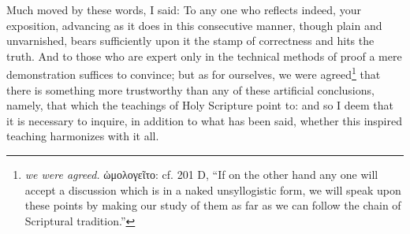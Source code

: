 Much moved by these words, I said: To any one who reflects indeed, your exposition, advancing as it does in this consecutive manner, though plain and unvarnished, bears sufficiently upon it the stamp of correctness and hits the truth. And to those who are expert only in the technical methods of proof a mere demonstration suffices to convince; but as for ourselves, we were agreed\footnote{\emph{we were agreed.} \textgreek{ὡμολογεῖτο}: cf. 201 D, “If on the other hand any one will accept a discussion which is in a naked unsyllogistic form, we will speak upon these points by making our study of them as far as we can follow the chain of Scriptural tradition.”} that there is something more trustworthy than any of these artificial conclusions, namely, that which the teachings of Holy Scripture point to: and so I deem that it is necessary to inquire, in addition to what has been said, whether this inspired teaching harmonizes with it all.

